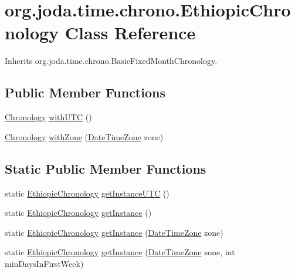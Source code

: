 \hypertarget{classorg_1_1joda_1_1time_1_1chrono_1_1_ethiopic_chronology}{\section{org.\-joda.\-time.\-chrono.\-Ethiopic\-Chronology Class Reference}
\label{classorg_1_1joda_1_1time_1_1chrono_1_1_ethiopic_chronology}
}


Inherits org.\-joda.\-time.\-chrono.\-Basic\-Fixed\-Month\-Chronology.

\subsection*{Public Member Functions}
\begin{DoxyCompactItemize}
\item 
\hyperlink{classorg_1_1joda_1_1time_1_1_chronology}{Chronology} \hyperlink{classorg_1_1joda_1_1time_1_1chrono_1_1_ethiopic_chronology_aac9b3588161aa267d650cd74c27cebbb}{with\-U\-T\-C} ()
\item 
\hyperlink{classorg_1_1joda_1_1time_1_1_chronology}{Chronology} \hyperlink{classorg_1_1joda_1_1time_1_1chrono_1_1_ethiopic_chronology_aa50dced9f21c322b19c78de8cedec8b3}{with\-Zone} (\hyperlink{classorg_1_1joda_1_1time_1_1_date_time_zone}{Date\-Time\-Zone} zone)
\end{DoxyCompactItemize}
\subsection*{Static Public Member Functions}
\begin{DoxyCompactItemize}
\item 
static \hyperlink{classorg_1_1joda_1_1time_1_1chrono_1_1_ethiopic_chronology}{Ethiopic\-Chronology} \hyperlink{classorg_1_1joda_1_1time_1_1chrono_1_1_ethiopic_chronology_a530d711d571113b34648db548506bd9b}{get\-Instance\-U\-T\-C} ()
\item 
static \hyperlink{classorg_1_1joda_1_1time_1_1chrono_1_1_ethiopic_chronology}{Ethiopic\-Chronology} \hyperlink{classorg_1_1joda_1_1time_1_1chrono_1_1_ethiopic_chronology_a86d9dc0577166c90441b379210595dba}{get\-Instance} ()
\item 
static \hyperlink{classorg_1_1joda_1_1time_1_1chrono_1_1_ethiopic_chronology}{Ethiopic\-Chronology} \hyperlink{classorg_1_1joda_1_1time_1_1chrono_1_1_ethiopic_chronology_afee97a997eaaa0905509da18e1ba26ad}{get\-Instance} (\hyperlink{classorg_1_1joda_1_1time_1_1_date_time_zone}{Date\-Time\-Zone} zone)
\item 
static \hyperlink{classorg_1_1joda_1_1time_1_1chrono_1_1_ethiopic_chronology}{Ethiopic\-Chronology} \hyperlink{classorg_1_1joda_1_1time_1_1chrono_1_1_ethiopic_chronology_a78241da8b8222afcf7254484738cb558}{get\-Instance} (\hyperlink{classorg_1_1joda_1_1time_1_1_date_time_zone}{Date\-Time\-Zone} zone, int min\-Days\-In\-First\-Week)
\end{DoxyCompactItemize}
